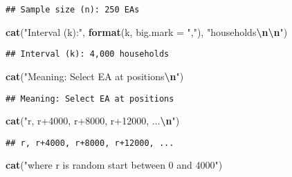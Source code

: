 \documentclass[
]{article}
\newenvironment{Shaded}{\begin{snugshade}}{\end{snugshade}}
\newcommand{\AttributeTok}[1]{\textcolor[rgb]{0.13,0.29,0.53}{#1}}
\newcommand{\FunctionTok}[1]{\textcolor[rgb]{0.13,0.29,0.53}{\textbf{#1}}}
\newcommand{\NormalTok}[1]{#1}
\newcommand{\SpecialCharTok}[1]{\textcolor[rgb]{0.81,0.36,0.00}{\textbf{#1}}}
\newcommand{\StringTok}[1]{\textcolor[rgb]{0.31,0.60,0.02}{#1}}
\begin{document}
\begin{Shaded}
\end{Shaded}

\begin{verbatim}
## Sample size (n): 250 EAs
\end{verbatim}

\begin{Shaded}
\begin{Highlighting}[]
\FunctionTok{cat}\NormalTok{(}\StringTok{"Interval (k):"}\NormalTok{, }\FunctionTok{format}\NormalTok{(k, }\AttributeTok{big.mark =} \StringTok{","}\NormalTok{), }\StringTok{"households}\SpecialCharTok{\textbackslash{}n\textbackslash{}n}\StringTok{"}\NormalTok{)}
\end{Highlighting}
\end{Shaded}

\begin{verbatim}
## Interval (k): 4,000 households
\end{verbatim}

\begin{Shaded}
\begin{Highlighting}[]
\FunctionTok{cat}\NormalTok{(}\StringTok{"Meaning: Select EA at positions}\SpecialCharTok{\textbackslash{}n}\StringTok{"}\NormalTok{)}
\end{Highlighting}
\end{Shaded}

\begin{verbatim}
## Meaning: Select EA at positions
\end{verbatim}

\begin{Shaded}
\begin{Highlighting}[]
\FunctionTok{cat}\NormalTok{(}\StringTok{"r, r+4000, r+8000, r+12000, ...}\SpecialCharTok{\textbackslash{}n}\StringTok{"}\NormalTok{)}
\end{Highlighting}
\end{Shaded}

\begin{verbatim}
## r, r+4000, r+8000, r+12000, ...
\end{verbatim}

\begin{Shaded}
\begin{Highlighting}[]
\FunctionTok{cat}\NormalTok{(}\StringTok{"where r is random start between 0 and 4000"}\NormalTok{)}
\end{Highlighting}
\end{Shaded}
\end{document}
